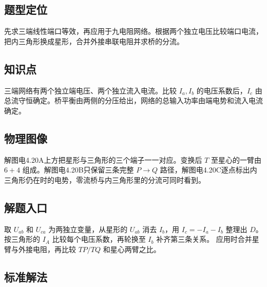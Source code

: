 \documentclass[UTF8,fontset=fandol,a4paper,11pt]{ctexart}
\begin{document}


\subsection*{题型定位}

先求三端线性端口等效，再应用于九电阻网络。根据两个独立电压比较端口电流，把内三角形换成星形，合并外接串联电阻并求桥的分流。



\subsection*{知识点}

三端网络有两个独立端电压、两个独立流入电流。比较 $I_a,I_b$ 的电压系数后，$I_c$ 由总流守恒确定。桥平衡由两侧的分压给出，网络的总输入功率由端电势和流入电流确定。



\subsection*{物理图像}

解图电4.20A上方把星形与三角形的三个端子一一对应。变换后 $T$ 至星心的一臂由 $6+4$ 组成。解图电4.20B只保留三条完整 $P\to Q$ 路径，解图电4.20C逐点标出内三角形仍在时的电势，零流桥与内三角形里的分流可同时看到。



\subsection*{解题入口}

取 $U_{ab}$ 和 $U_{ca}$ 为两独立变量，从星形的 $U_{ab}$ 消去 $I_b$，用 $I_c=-I_a-I_b$ 整理出 $D$。按三角形的 $I_A$ 比较每个电压系数，再轮换至 $I_b$ 补齐第三条关系。
应用时合并星臂与外接电阻，再比较 $TP/TQ$ 和星心两臂之比。


\subsection*{标准解法}
\end{document}
